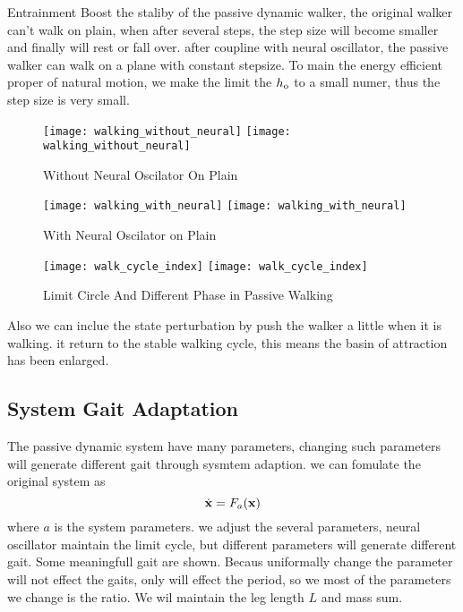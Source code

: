 Entrainment Boost the staliby of the passive dynamic walker, 
the original walker can't walk on plain, when after several steps, the step size will become smaller and finally will rest or fall over.
after coupline with neural oscillator, the passive walker can walk on a plane with constant stepsize.
To main the energy efficient proper of natural motion, we make the limit the $h_{\mathrm{o}}$ to a small numer, thus the step size is very small.

\begin{figure}[!htbp]
  \begin{center}
    \leavevmode
    \ifpdf
      \texttt{[image: walking\_without\_neural]}
    \else
      \texttt{[image: walking\_without\_neural]}
    \fi
    \caption{Without Neural Oscilator On Plain}
    \label{fig:fwalkingphase}
\end{center}
\end{figure}

\begin{figure}[!htbp]
  \begin{center}
    \leavevmode
    \ifpdf
      \texttt{[image: walking\_with\_neural]}
    \else
      \texttt{[image: walking\_with\_neural]}
    \fi
    \caption{With Neural Oscilator on Plain}
    \label{fig:fourphaselimitcycle}
\end{center}
\end{figure}

\begin{figure}[!htbp]
  \begin{center}
    \leavevmode
    \ifpdf
      \texttt{[image: walk\_cycle\_index]}
    \else
      \texttt{[image: walk\_cycle\_index]}
    \fi
    \caption{Limit Circle And Different Phase in Passive Walking}
    \label{fig:fourphaselimitcycle}
\end{center}
\end{figure}


Also we can inclue the state perturbation by push the walker a little when it is walking.
it return to the stable walking cycle, this means the basin of attraction has been enlarged.





\subsection{System Gait Adaptation}
The passive dynamic system have many parameters, changing such parameters will generate different gait through sysmtem adaption.
we can fomulate the original system as
\[
\dot{\mathbf{x}}=F_a(\mathbf{x})
\]
where $a$ is the system parameters.
we adjust the several parameters, neural oscillator maintain the limit cycle, but different parameters will generate different gait.
Some meaningfull gait are shown.
Becaus uniformally change the parameter will not effect the gaits, only will effect the period, so we most of the parameters we change is the ratio.
We wil maintain the leg length $L$ and mass sum.
